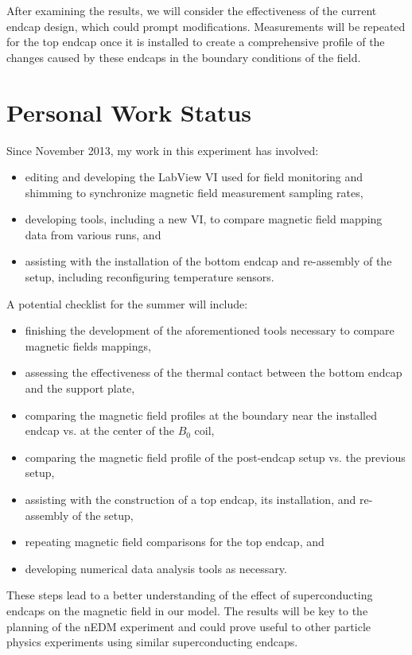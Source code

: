\documentclass[twocolumn,aps,prb,citeautoscript]{revtex4-1}
\begin{document}
After examining the results, we will consider the effectiveness of the current
endcap design, which could prompt modifications. Measurements
will be repeated for the top endcap once it is installed
to create a comprehensive profile of
the changes caused by these endcaps in the boundary conditions of the field.

\section{Personal Work Status}

Since November 2013, my work in this experiment has involved:
\begin{itemize}
\item editing and developing the LabView VI used for field monitoring and
shimming to synchronize magnetic field measurement sampling rates,
\item developing tools, including a new VI, to compare magnetic field mapping
data from various runs, and
\item assisting with the installation of the bottom endcap and re-assembly
of the setup, including reconfiguring temperature sensors.
\end{itemize}

A potential checklist for the summer will include:
\begin{itemize}
\item finishing the development of the aforementioned tools necessary to
compare magnetic fields mappings,
\item assessing the effectiveness of the thermal contact between the bottom
endcap and the support plate,
\item comparing the magnetic field profiles at the boundary near the installed
endcap vs. at the center of the $B_0$ coil,
\item comparing the magnetic field profile of the post-endcap setup vs. the
previous setup,
\item assisting with the construction of a top endcap, its installation, and
re-assembly of the setup,
\item repeating magnetic field comparisons for the top endcap, and
\item developing numerical data analysis tools as necessary.
\end{itemize}

These steps lead to a better understanding of the effect of
superconducting endcaps on the magnetic field in our model. The
results will be key to the planning of the nEDM experiment and could prove
useful to other particle physics experiments using similar superconducting
endcaps.
\end{document}
